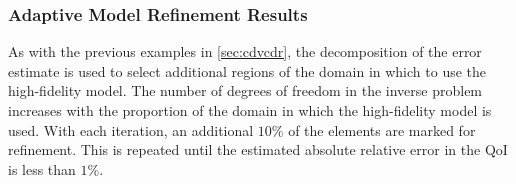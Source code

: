\subsubsection{Adaptive Model Refinement Results}

As with the previous examples in \cref{sec:cdvcdr}, the decomposition of the error estimate is used to select additional regions of the domain in which to use the high-fidelity model. The number of degrees of freedom in the inverse problem increases with the proportion of the domain in which the high-fidelity model is used. With each iteration, an additional $10\%$ of the elements are marked for refinement. This is repeated until the estimated absolute relative error in the QoI is less than $1\%$.

